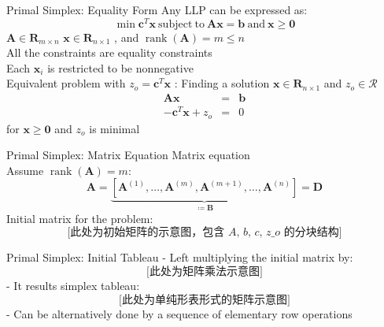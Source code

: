\documentclass[aspectratio=169,hyperref,UTF8,CJK]{beamer}
\begin{document}
\begin{frame}{Primal Simplex: Equality Form}
Any LLP can be expressed as:
\[
\min \mathbf{c}^T\mathbf{x}\mathrm{~subject~to~}\mathbf{A}\mathbf{x} = \mathbf{b}\mathrm{~and~}\mathbf{x}\geq \mathbf{0}
\]
\(\mathbf{A} \in \mathbf{R}_{m\times n}\) \(\mathbf{x}\in \mathbf{R}_{n\times 1}\) , and \(\operatorname {rank}(\mathbf{A}) = m\leq n\) \\
All the constraints are equality constraints \\
Each \(\mathbf{x}_i\) is restricted to be nonnegative \\
Equivalent problem with \(z_{o} = \mathbf{c}^{T}\mathbf{x}\) : Finding a solution \(\mathbf{x}\in \mathbf{R}_{n\times 1}\) and \(z_{o}\in \mathcal{R}\)
\[
\begin{array}{rcl}{\mathbf{A}\mathbf{x}} & = & {\mathbf{b}}\\ {-\mathbf{c}^{T}\mathbf{x} + z_{o}} & = & {0} \end{array}
\]
for \(\mathbf{x}\geq \mathbf{0}\) and \(z_{o}\) is minimal
\end{frame}

\begin{frame}{Primal Simplex: Matrix Equation}
Matrix equation \\
Assume \(\operatorname{rank}(\mathbf{A}) = m\):
\[
\mathbf{A} = \underbrace{\left[\mathbf{A}^{(1)},\ldots,\mathbf{A}^{(m)},\mathbf{A}^{(m + 1)},\ldots,\mathbf{A}^{(n)}\right]}_{\coloneqq \mathbf{B}} = \mathbf{D}
\]
Initial matrix for the problem:
\[
\textit{[此处为初始矩阵的示意图，包含 A, b, c, z_o 的分块结构]}
\]
\end{frame}

\begin{frame}{Primal Simplex: Initial Tableau}
- Left multiplying the initial matrix by:
\[
\textit{[此处为矩阵乘法示意图]}
\]
- It results simplex tableau:
\[
\textit{[此处为单纯形表形式的矩阵示意图]}
\]
- Can be alternatively done by a sequence of elementary row operations
\end{frame}
\end{document}
